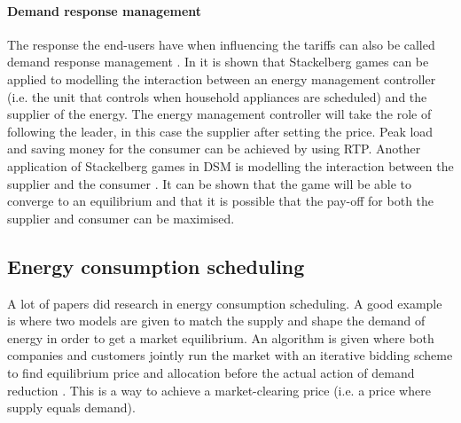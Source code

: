 \paragraph{Demand response management}
The response the end-users have when influencing the tariffs can also be called demand response management \cite{MaharjanZhuZhangEtAl2013}.
In \cite{ChenKishoreSnyder2011} it is shown that Stackelberg games can be applied to modelling the interaction between an energy management controller (i.e. the unit that controls when household appliances are scheduled) and the supplier of the energy. The energy management controller will take the role of following the leader, in this case the supplier after setting the price. Peak load and saving money for the consumer can be achieved by using RTP. Another application of Stackelberg games in DSM is modelling the interaction between the supplier and the consumer \cite{MaharjanZhuZhangEtAl2013}. It can be shown that the game will be able to converge to an equilibrium and that it is possible that the pay-off for both the supplier and consumer can be maximised. 

\subsection{Energy consumption scheduling}
A lot of papers did research in energy consumption scheduling. A good example is \cite{ChenLiLowEtAl2010} where two models are given to match the supply and shape the demand of energy in order to get a market equilibrium. An algorithm is given where both companies and customers jointly run the market with an iterative bidding scheme to find equilibrium price and allocation before the actual action of demand reduction \cite{ChenLiLowEtAl2010}. This is a way to achieve a market-clearing price (i.e. a price where supply equals demand).

